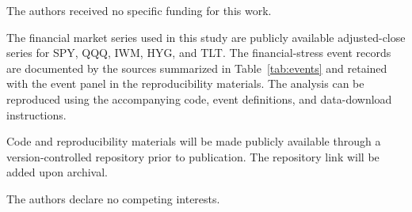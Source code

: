 \documentclass[pdflatex,sn-mathphys-num]{sn-jnl}
\begin{document}
The authors received no specific funding for this work.

The financial market series used in this study are publicly available adjusted-close series for SPY, QQQ, IWM, HYG, and TLT. The financial-stress event records are documented by the sources summarized in Table~\ref{tab:events} and retained with the event panel in the reproducibility materials. The analysis can be reproduced using the accompanying code, event definitions, and data-download instructions.

Code and reproducibility materials will be made publicly available through a version-controlled repository prior to publication. The repository link will be added upon archival.

The authors declare no competing interests.
\end{document}
